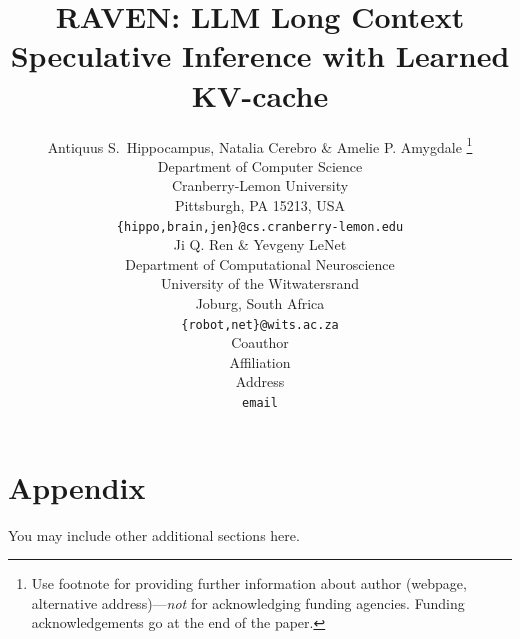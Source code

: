 \documentclass{article} %
\title{RAVEN: LLM Long Context Speculative Inference with Learned KV-cache }
\author{Antiquus S.~Hippocampus, Natalia Cerebro \& Amelie P. Amygdale \thanks{ Use footnote for providing further information
about author (webpage, alternative address)---\emph{not} for acknowledging
funding agencies.  Funding acknowledgements go at the end of the paper.} \\
Department of Computer Science\\
Cranberry-Lemon University\\
Pittsburgh, PA 15213, USA \\
\texttt{\{hippo,brain,jen\}@cs.cranberry-lemon.edu} \\
\And
Ji Q. Ren \& Yevgeny LeNet \\
Department of Computational Neuroscience \\
University of the Witwatersrand \\
Joburg, South Africa \\
\texttt{\{robot,net\}@wits.ac.za} \\
\AND
Coauthor \\
Affiliation \\
Address \\
\texttt{email}
}
\begin{document}
\maketitle









% 
% 








\appendix
\section{Appendix}
You may include other additional sections here.
\end{document}
